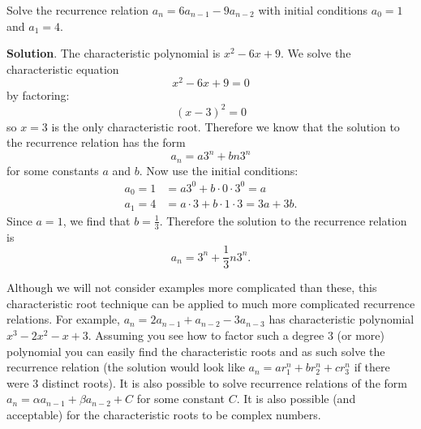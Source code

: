 \documentclass[11pt,]{book}
\theoremstyle{ptxplainnotitle}
\theoremstyle{ptxplaintitle}
\theoremstyle{ptxdefinitionnotitle}
\theoremstyle{ptxdefinitiontitle}
\theoremstyle{ptxdefinitionnotitle}
\theoremstyle{ptxdefinitiontitle}
\theoremstyle{ptxdefinitionnotitle}
\theoremstyle{ptxdefinitiontitle}
\theoremstyle{ptxdefinitiontitlenonumber}
\theoremstyle{ptxdefinitiontitlenonumber}
\numberwithin{equation}{chapter}
\newcommand{\amp}{&}
\begin{document}
\begin{example}\label{example-24}
\hypertarget{p-487}{}%
Solve the recurrence relation \(a_n = 6a_{n-1} - 9a_{n-2}\) with initial conditions \(a_0 = 1\) and \(a_1 = 4\).%
\par\smallskip%
\noindent\textbf{Solution}.\hypertarget{solution-65}{}\quad%
\hypertarget{p-488}{}%
The characteristic polynomial is \(x^2 - 6x + 9\). We solve the characteristic equation%
\begin{equation*}
x^2 - 6x + 9 = 0
\end{equation*}
by factoring:%
\begin{equation*}
(x - 3)^2 = 0
\end{equation*}
so \(x =3\) is the only characteristic root. Therefore we know that the solution to the recurrence relation has the form%
\begin{equation*}
a_n = a 3^n + bn3^n
\end{equation*}
for some constants \(a\) and \(b\). Now use the initial conditions:%
\begin{align*}
a_0 = 1 \amp = a 3^0 + b\cdot 0 \cdot 3^0 = a\\
a_1 = 4 \amp = a\cdot 3 + b\cdot 1 \cdot3 = 3a + 3b.
\end{align*}
Since \(a = 1\), we find that \(b = \frac{1}{3}\). Therefore the solution to the recurrence relation is%
\begin{equation*}
a_n = 3^n + \frac{1}{3}n3^n.
\end{equation*}
%
\end{example}
\hypertarget{p-489}{}%
Although we will not consider examples more complicated than these, this characteristic root technique can be applied to much more complicated recurrence relations. For example, \(a_n = 2a_{n-1} + a_{n-2} - 3a_{n-3}\) has characteristic polynomial \(x^3 - 2 x^2 - x + 3\). Assuming you see how to factor such a degree 3 (or more) polynomial you can easily find the characteristic roots and as such solve the recurrence relation (the solution would look like \(a_n = ar_1^n + br_2^n + cr_3^n\) if there were 3 distinct roots). It is also possible to solve recurrence relations of the form \(a_n = \alpha a_{n-1} + \beta a_{n-2} + C\) for some constant \(C\). It is also possible (and acceptable) for the characteristic roots to be complex numbers.%
\typeout{************************************************}
\typeout{************************************************}
\end{document}

